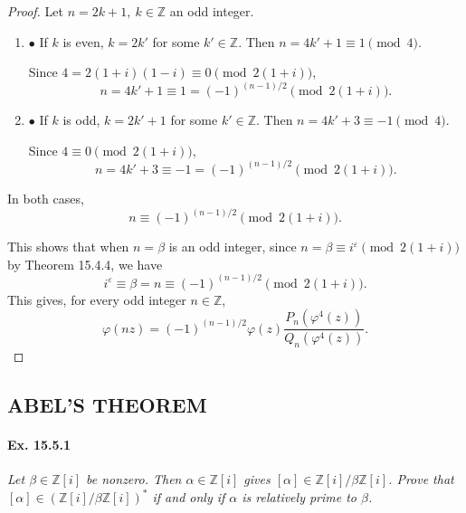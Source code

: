 \documentclass[11pt,a4paper]{article}
\newcommand{\be} {\begin{enumerate}}
\newcommand{\ee} {\end{enumerate}}
\newcommand{\Z}{\mathbb{Z}}
\begin{document}
\begin{proof} 
Let $n = 2k+1,\ k \in \Z$ an odd integer.
\be
\item[$\bullet$] If $k$ is even, $k = 2k'$ for some $k'\in \Z$. Then $n = 4k'+1 \equiv 1 \pmod 4$.

Since $4 = 2(1+i)(1-i) \equiv 0 \pmod {2(1+i)}$, $$n = 4k'+1 \equiv 1 = (-1)^{(n-1)/2} \pmod{2(1+i)}.$$
\item[$\bullet$]If $k$ is odd, $k = 2k'+1$ for some $k'\in \Z$. Then $n = 4k'+ 3 \equiv -1 \pmod 4$.

Since $4 \equiv 0 \pmod {2(1+i)}$,
$$n = 4k'+3 \equiv -1 = (-1)^{(n-1)/2} \pmod {2(1+i)}.$$
\ee
In both cases, 
$$n \equiv (-1)^{(n-1)/2} \pmod {2(1+i)}.$$

\bigskip

This shows that when $n = \beta$ is an odd integer, since $n = \beta \equiv i^\varepsilon \pmod {2(1+i)}$ by Theorem 15.4.4, we have
$$i^\varepsilon \equiv \beta = n \equiv (-1)^{(n-1)/2} \pmod {2(1+i)}.$$
This gives, for every odd integer $n \in \Z$,
$$\varphi(nz) = (-1)^{(n-1)/2} \varphi(z) \frac{P_n\left(\varphi^4(z)\right)}{Q_n\left(\varphi^4(z)\right)}.$$
\end{proof}

\subsection{ABEL'S THEOREM}
\paragraph{Ex. 15.5.1}{\it  Let $\beta \in \Z[i]$ be nonzero. Then $\alpha \in \Z[i]$ gives $[\alpha] \in \Z[i]/\beta \Z[i]$. Prove that $[\alpha] \in \left(\Z[i]/ \beta \Z[i] \right)^*$ if and only if $\alpha$ is relatively prime to $\beta$.
}
\end{document}
